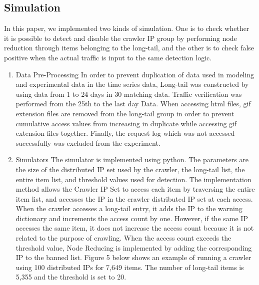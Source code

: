 \documentclass[sigconf,anonymous=false]{acmart}
\begin{document}
\subsection{Simulation}
In this paper, we implemented two kinds of simulation. One is to check whether it is possible to detect and disable the crawler IP group by performing node reduction through items belonging to the long-tail, and the other is to check false positive when the actual traffic is input to the same detection logic.



\begin{enumerate}
\item Data Pre-Processing
\newline In order to prevent duplication of data used in modeling and experimental data in the time series data, Long-tail was constructed by using data from 1 to 24 days in 30 matching data. Traffic verification was performed from the 25th to the last day Data.
When accessing html files, gif extension files are removed from the long-tail group in order to prevent cumulative access values from increasing in duplicate while accessing gif extension files together.
Finally, the request log which was not accessed successfully was excluded from the experiment.

\item Simulators
\newline 
The simulator is implemented using python. The parameters are the size of the distributed IP set used by the crawler, the long-tail list, the entire item list, and threshold values used for detection.
The implementation method allows the Crawler IP Set to access each item by traversing the entire item list, and accesses the IP in the crawler distributed IP set at each access.
When the crawler accesses a long-tail entry, it adds the IP to the warning dictionary and increments the access count by one. However, if the same IP accesses the same item, it does not increase the access count because it is not related to the purpose of crawling. When the access count exceeds the threshold value, Node Reducing is implemented by adding the corresponding IP to the banned list. Figure 5 below shows an example of running a crawler using 100 distributed IPs for 7,649 items. The number of long-tail items is 5,355 and the threshold is set to 20. 


\end{enumerate}
\end{document}
